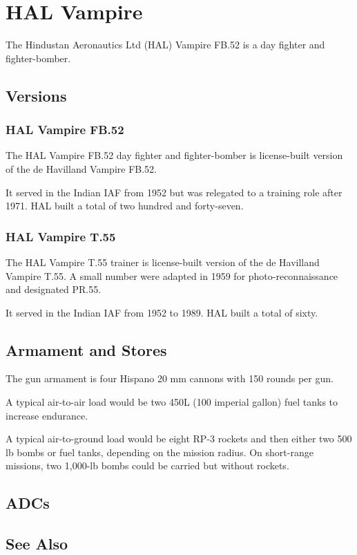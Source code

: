 \section{HAL Vampire}

The Hindustan Aeronautics Ltd (HAL) Vampire FB.52 is a day fighter and fighter-bomber.

\subsection{Versions}

\subsubsection{HAL Vampire FB.52}

The HAL Vampire FB.52 day fighter and fighter-bomber is license-built version of the de Havilland Vampire FB.52.

It served in the Indian IAF from 1952 but was relegated to a training role after 1971. HAL built a total of two hundred and forty-seven.

\subsubsection{HAL Vampire T.55}

The HAL Vampire T.55 trainer is license-built version of the de Havilland Vampire T.55. A small number were adapted in 1959 for photo-reconnaissance and designated PR.55.

It served in the Indian IAF from 1952 to 1989. HAL built a total of sixty.


\subsection{Armament and Stores}

The gun armament is four Hispano 20 mm cannons with 150 rounds per gun. 

A typical air-to-air load would be two 450L (100 imperial gallon) fuel tanks to increase endurance. 

A typical air-to-ground load would be eight RP-3 rockets and then either two 500 lb bombs or fuel tanks, depending on the mission radius. On short-range missions, two 1,000-lb bombs could be carried but without rockets.

\subsection{ADCs}

\begin{adclist}
\end{adclist}

\subsection{See Also}

\begin{typelist}
\end{typelist}
